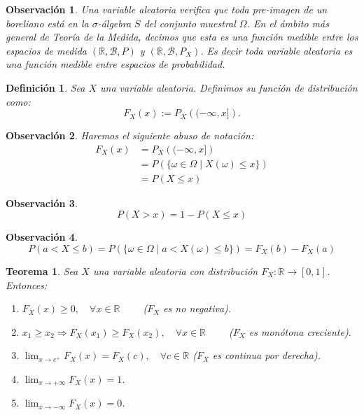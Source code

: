 \documentclass{report}
\newtheorem{thm}{Teorema}[section]
\newtheorem{dfn}{Definición}[section]
\newtheorem{obs}{Observación}[section]
\begin{document}
\begin{obs}
Una variable aleatoria verifica que toda pre-imagen de un boreliano está en la $\sigma$-álgebra $S$ del conjunto muestral $\Omega$.
En el ámbito más general de Teoría de la Medida, decimos que esta es una función \emph{medible} entre los espacios de medida
$(\mathbb{R}, \mathcal{B}, P)$ y $(\mathbb{R}, \mathcal{B}, P_X)$. Es decir toda variable aleatoria es una función medible entre espacios de probabilidad.
\end{obs}

\begin{dfn}
Sea $X$ una variable aleatoria. Definimos su \emph{función de distribución} como:
$$
    F_X(x) := P_X\left( (-\infty, x] \right).
$$
\end{dfn}

\begin{obs} Haremos el siguiente abuso de notación:
    \begin{equation*}
        \begin{split}
            F_X(x) &= P_X\left( (-\infty, x] \right)\\
            & = P\left( \{\omega \in \Omega \;|\; X(\omega) \leq x\} \right)\\
            & = P(X\leq x)
        \end{split}
    \end{equation*}
\end{obs}

\begin{obs}
\begin{equation*}
    P(X>x) = 1 - P(X\leq x)
\end{equation*}
\end{obs}

\begin{obs}
\begin{equation*}
    P(a<X\leq b) =  P\left( \{\omega \in \Omega \;|\; a< X(\omega) \leq b\} \right) = F_X(b)-F_X(a)
\end{equation*}
\end{obs}

\begin{thm}
Sea $X$ una variable aleatoria con distribución $F_X:\mathbb{R}\rightarrow[0,1]$. Entonces:
\begin{enumerate}
\item $F_X(x)\geq 0, \quad \forall x \in \mathbb{R} \qquad$ ($F_X$ es no negativa).
\item $ x_1 \geq x_2 \Rightarrow F_X(x_1)\geq F_X(x_2), \quad \forall x \in \mathbb{R} \qquad$ ($F_X$ es monótona creciente).
\item $\lim_{x\rightarrow c^+}F_X(x) = F_X(c), \quad \forall c \in \mathbb{R}$ ($F_X$ es continua por derecha).
\item $\lim_{x\rightarrow +\infty}F_X(x) = 1 $.
\item $\lim_{x\rightarrow -\infty}F_X(x) = 0 $.
\end{enumerate}
\end{thm}
\end{document}

